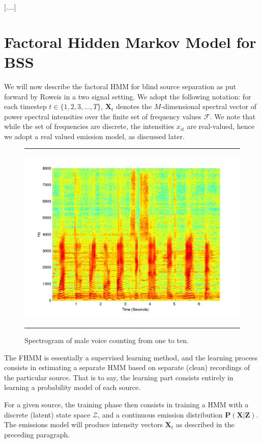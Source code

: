 \documentclass[11pt, oneside, a4paper]{report}
\begin{document}
[....]

\section{Factoral Hidden Markov Model for BSS}\label{fhmm}

We will now describe the factoral HMM for blind source separation as
put forward by Roweis in a two signal setting. We adopt the following
notation: for each timestep $t \in \{1,2,3,...,T\}$, $\mathbf{X}_t$
denotes the $M$-dimensional spectral vector of power spectral
intensities over the finite set of frequency values $\mathcal{F}$. We
note that while the set of frequencies are discrete, the intensities
$x_{it}$ are real-valued, hence we adopt a real valued emission
model, as discussed later. 


\begin{figure}
  \centering
  \hrule
  \includegraphics[width = .9\textwidth]{Figures/spectrogram_count}
  \hrule
  \caption{Spectrogram of male voice counting from one to ten.}
\end{figure}


The FHMM is essentially a supervised learning method, and the learning
process consists in estimating a separate HMM based on separate (clean) recordings of the
particular source. That is to say, the learning part consists entirely
in learning a probability model of each source. 

For a given source, the training phase then consists in
training a HMM with a discrete (latent) state space $\mathcal{Z}$, and
a continuous emission distribution $\mathbf{P(X|Z)}$. The emissions
model will produce intensity vectors $\mathbf{X}_t$ as described in
the preceding paragraph.
\end{document}
